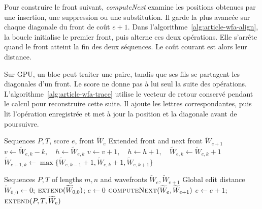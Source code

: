 Pour construire le front suivant, \textit{computeNext} examine les positions obtenues par une insertion, une suppression ou une substitution. Il garde la plus avancée sur chaque diagonale du front de coût \(e+1\). Dans l’algorithme~\ref{alg:article-wfa-align}, la boucle initialise le premier front, puis alterne ces deux opérations. Elle s’arrête quand le front atteint la fin des deux séquences. Le coût courant est alors leur distance.

Sur GPU, un bloc peut traiter une paire, tandis que ses fils se partagent les diagonales d’un front. Le score ne donne pas à lui seul la suite des opérations. L’algorithme~\ref{alg:article-wfa-trace} utilise le vecteur de retour conservé pendant le calcul pour reconstruire cette suite. Il ajoute les lettres correspondantes, puis lit l’opération enregistrée et met à jour la position et la diagonale avant de poursuivre.
\begin{algorithm}[!htbp]
\caption{Opérateurs de WFA~\cite[alg.~1 et 2, p.~63784]{wfagpu}}\label{alg:article-wfa-operators}
\small
\begin{algorithmic}[1]
\Require Sequences \(P,T\), score \(e\), front \(\widetilde W_e\)
\Ensure Extended front and next front \(\widetilde W_{e+1}\)
  \State \(v\gets\widetilde W_{e,k}-k,\quad h\gets\widetilde W_{e,k}\)
    \State \(v\gets v+1,\quad h\gets h+1,\quad \widetilde W_{e,k}\gets\widetilde W_{e,k}+1\)
  \EndWhile
\EndFor
{}
  \State \(\widetilde W_{e+1,k}\gets\max\{\widetilde W_{e,k-1}+1,\widetilde W_{e,k}+1,\widetilde W_{e,k+1}\}\)
\EndFor
\end{algorithmic}
\end{algorithm}
\begin{algorithm}[!htbp]
\caption{Boucle principale de WFA~\cite[alg.~3, p.~63785]{wfagpu}}\label{alg:article-wfa-align}
\small
\begin{algorithmic}[1]
\Require Sequences \(P,T\) of lengths \(m,n\) and wavefronts \(\widetilde W_e,\widetilde W_{e+1}\)
\Ensure Global edit distance
\State \(\widetilde W_{0,0}\gets0\); \(\Call{extend}{\widetilde W_{0,0}}\); \(e\gets0\)
  \State \(\Call{computeNext}{\widetilde W_e,\widetilde W_{e+1}}\)
  \State \(e\gets e+1\); \(\Call{extend}{P,T,\widetilde W_e}\)
\EndWhile
\end{algorithmic}
\end{algorithm}
